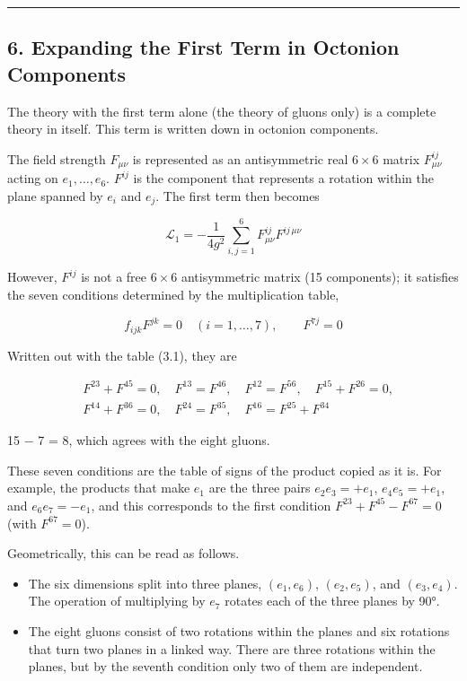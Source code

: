 \documentclass[
  a4paper,
]{article}
\providecommand{\tightlist}{%
  \setlength{\itemsep}{0pt}\setlength{\parskip}{0pt}}
\begin{document}
\begin{center}\rule{0.5\linewidth}{0.5pt}\end{center}

\subsection{6. Expanding the First Term in Octonion
Components}\label{expanding-the-first-term-in-octonion-components}

The theory with the first term alone (the theory of gluons only) is a
complete theory in itself. This term is written down in octonion
components.

The field strength \(F_{\mu\nu}\) is represented as an antisymmetric
real \(6\times6\) matrix \(F^{ij}_{\mu\nu}\) acting on
\(e_1, \dots, e_6\). \(F^{ij}\) is the component that represents a
rotation within the plane spanned by \(e_i\) and \(e_j\). The first term
then becomes

\[
\mathcal{L}_1 = -\frac{1}{4g^2}\sum_{i,j=1}^{6} F^{ij}_{\mu\nu}F^{ij\,\mu\nu} \tag{6.1}
\]

However, \(F^{ij}\) is not a free \(6\times6\) antisymmetric matrix (15
components); it satisfies the seven conditions determined by the
multiplication table,

\[
f_{ijk}F^{jk} = 0\quad(i = 1, \dots, 7),\qquad F^{7j} = 0 \tag{6.2}
\]

Written out with the table (3.1), they are

\[
\begin{aligned}
&F^{23} + F^{45} = 0,\quad F^{13} = F^{46},\quad F^{12} = F^{56},\quad F^{15} + F^{26} = 0,\\
&F^{14} + F^{36} = 0,\quad F^{24} = F^{35},\quad F^{16} = F^{25} + F^{34}
\end{aligned}
\]

15 − 7 = 8, which agrees with the eight gluons.

These seven conditions are the table of signs of the product copied as
it is. For example, the products that make \(e_1\) are the three pairs
\(e_2e_3 = +e_1\), \(e_4e_5 = +e_1\), and \(e_6e_7 = -e_1\), and this
corresponds to the first condition \(F^{23} + F^{45} - F^{67} = 0\)
(with \(F^{67} = 0\)).

Geometrically, this can be read as follows.

\begin{itemize}
\tightlist
\item
  The six dimensions split into three planes, \((e_1, e_6)\),
  \((e_2, e_5)\), and \((e_3, e_4)\). The operation of multiplying by
  \(e_7\) rotates each of the three planes by 90°.
\item
  The eight gluons consist of two rotations within the planes and six
  rotations that turn two planes in a linked way. There are three
  rotations within the planes, but by the seventh condition only two of
  them are independent.
\end{itemize}
\end{document}
